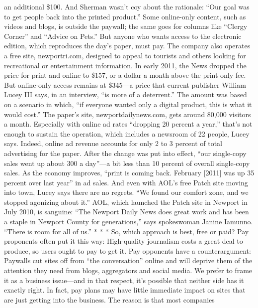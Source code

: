 an additional \$100. And Sherman wasn't coy about the rationale: ``Our goal was
to get people back into the printed product.''
Some online-only content, such as videos and blogs, is outside the paywall; the
same goes for columns like ``Clergy Corner'' and ``Advice on Pets.'' But anyone
who wants access to the electronic edition, which reproduces the day's paper,
must pay. The company also operates a free site, newportri.com, designed to appeal
to tourists and others looking for recreational or entertainment information.
In early 2011, the News dropped the price for print and online to \$157, or
a dollar a month above the print-only fee. But online-only access remains at
\$345—a price that current publisher William Lucey III says, in an interview, ``is
more of a deterrent.'' The amount was based on a scenario in which, ``if everyone
wanted only a digital product, this is what it would cost.''
The paper's site, newportdailynews.com, gets around 80,000 visitors a month.
Especially with online ad rates ``dropping 20 percent a year,'' that's not enough
to sustain the operation, which includes a newsroom of 22 people, Lucey says.
Indeed, online ad revenue accounts for only 2 to 3 percent of total advertising
for the paper.
After the change was put into effect, ``our single-copy sales went up about 300
a day''—a bit less than 10 percent of overall single-copy sales. As the economy
improves, ``print is coming back. February [2011] was up 35 percent over last
year'' in ad sales.
And even with AOL's free Patch site moving into town, Lucey says there are
no regrets. ``We found our comfort zone, and we stopped agonizing about it.''
AOL, which launched the Patch site in Newport in July 2010, is sanguine: ``The
Newport Daily News does great work and has been a staple in Newport County
for generations,'' says spokeswoman Janine Iamunno. ``There is room for all of us.''
* * *
So, which approach is best, free or paid?
Pay proponents often put it this way: High-quality journalism costs a great deal
to produce, so users ought to pay to get it. Pay opponents have a counterargument:
Paywalls cut sites off from ``the conversation'' online and will deprive them
of the attention they need from blogs, aggregators and social media.
We prefer to frame it as a business issue—and in that respect, it's possible that
neither side has it exactly right. In fact, pay plans may have little immediate impact
on sites that are just getting into the business. The reason is that most companies

